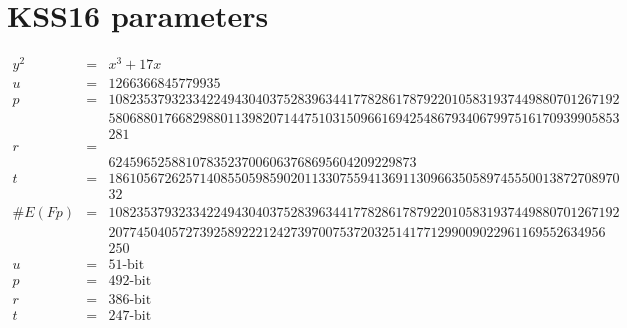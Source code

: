 \section{KSS16 parameters}
\label{appendix:KSS16}
\begin{eqnarray}
y^2 & = & x^3 + 17x \nonumber \\ 
u & = & 1266366845779935 \nonumber \\ 
p & = & 1082353793233422494304037528396344177828617879220105831937449880701267192 \nonumber \\ 
& &  5806880176682988011398207144751031509661694254867934067997516170939905853\nonumber \\
& & 281\nonumber \\
r & = &  \nonumber \\
& &  62459652588107835237006063768695604209229873\nonumber \\
t & = &  1861056726257140855059859020113307559413691130966350589745550013872708970\nonumber \\
& & 32\nonumber \\
\#E(Fp) & = &  1082353793233422494304037528396344177828617879220105831937449880701267192\nonumber \\
& &  20774504057273925892221242739700753720325141771299009022961169552634956\nonumber \\
&& 250 \nonumber \\
u & = & 51\text{-bit} \nonumber \\
p & = & 492\text{-bit} \nonumber \\
r &  = & 386\text{-bit} \nonumber \\
t & = & 247\text{-bit} \nonumber
\end{eqnarray}